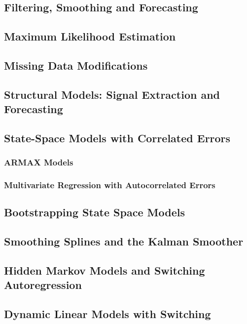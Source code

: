 \documentclass[12pt]{article}
\begin{document}
\subsection{Filtering, Smoothing and Forecasting}

\subsection{Maximum Likelihood Estimation}

\subsection{Missing Data Modifications}

\subsection{Structural Models: Signal Extraction and Forecasting}

\subsection{State-Space Models with Correlated Errors}
\subsubsection{ARMAX Models}

\subsubsection{Multivariate Regression with Autocorrelated Errors}

\subsection{Bootstrapping State Space Models}

\subsection{Smoothing Splines and the Kalman Smoother}

\subsection{Hidden Markov Models and Switching Autoregression}

\subsection{Dynamic Linear Models with Switching}
\end{document}
